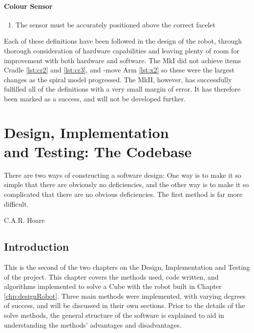 \documentclass{report}
\newcommand{\move}[1]{\uppercase{\texttt{\formatmovesnospace{#1}}}-move}
\begin{document}
	\subsubsection{Colour Sensor}
	
	\begin{enumerate}
		\item The sensor must be accurately positioned above the correct facelet \label{lst:cs1}
	\end{enumerate}

	Each of these definitions have been followed in the design of the robot, through thorough consideration of hardware capabilities and leaving plenty of room for improvement with both hardware and software. The MkI did not achieve items Cradle \ref{lst:cr2} and \ref{lst:cr3}, and \move{x} Arm \ref{lst:x2} so these were the largest changes as the spiral model progressed. The MkII, however, has successfully fulfilled all of the definitions with a very small margin of error. It has therefore been marked as a success, and will not be developed further.
    
    \newpage
    
    \chapter[Design, Implementation and Testing: The Codebase]{Design, Implementation \\ and Testing: The Codebase}
    \epigraph{There are two ways of constructing a software design: One way is to make it so simple that there are obviously no deficiencies, and the other way is to make it so complicated that there are no obvious deficiencies. The first method is far more difficult.}{C.A.R. Hoare\cite{Hoare1981}}
    
    \section{Introduction}
    
	This is the second of the two chapters on the Design, Implementation and Testing of the project. This chapter covers the methods used, code written, and algorithms implemented to solve a Cube with the robot built in Chapter \ref{chp:designRobot}. Three main methods were implemented, with varying degrees of success, and will be discussed in their own sections. Prior to the details of the solve methods, the general structure of the software is explained to aid in understanding the methods' advantages and disadvantages.
    
\end{document}
